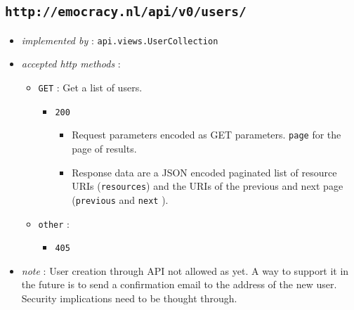 \documentclass[a4paper]{report}
\begin{document}
\subsection{\texttt{http://emocracy.nl/api/v0/users/}}
\begin{itemize}
    \item{\textsl{implemented by} : \texttt{api.views.UserCollection}}
    \item{\textsl{accepted http methods} :
        \begin{itemize}
            \item{\texttt{GET} : Get a list of users.
                \begin{itemize}
                    \item{\texttt{200}
                    \begin{itemize}
                        \item{Request parameters encoded as GET parameters. 
                        \texttt{page} for the page of results.}
                        \item{Response data are a JSON encoded paginated list of 
                        resource URIs (\texttt{resources}) and the URIs of the 
                        previous and next page (\texttt{previous} and \texttt{next}
                        ).}
                    \end{itemize}
                    }
                \end{itemize}
            }
            \item{\texttt{other} :
                \begin{itemize}
                    \item{\texttt{405}}
                \end{itemize}
            }
        \end{itemize}
    }
    \item{\textsl{note} : User creation through API not allowed as yet. A way to
    support it in the future is to send a confirmation email to the address of the
    new user. Security implications need to be thought through.}
\end{itemize}
\end{document}
